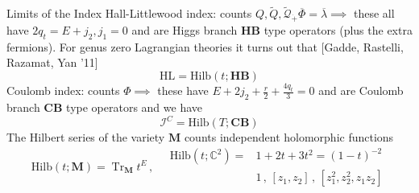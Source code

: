 \documentclass{beamer}
\DeclareMathOperator{\Tr}{Tr}
\begin{document}
\begin{frame}{Limits of the Index}
Hall-Littlewood index: counts $Q,\widetilde{Q}, \widetilde{\mathcal{Q}}_{\dot+}\overline{\Phi}=\overline{\lambda}\implies$ these all have $2q_t=E+j_2,j_1=0$ and are Higgs branch $\mathbf{HB}$ type operators (plus the extra fermions). For genus zero Lagrangian theories it turns out that \color{blue}[Gadde, Rastelli, Razamat, Yan '11]\color{black}
\begin{equation*}
    \mathrm{HL}=\mathrm{Hilb}(t;\mathbf{HB})
\end{equation*}
Coulomb index: counts $\Phi\implies$ these have $E+2j_2+\frac{r}{2}+\frac{4q_t}{3}=0$ and are Coulomb branch $\mathbf{CB}$ type operators and we have
\begin{equation*}
    \mathcal{I}^C=\mathrm{Hilb}(T;\mathbf{CB})
\end{equation*}
The Hilbert series of the variety $\mathbf{M}$ counts independent holomorphic functions
\begin{equation*}
    \mathrm{Hilb}(t;\mathbf{M})=\Tr_{\mathbf{M}}t^E\,,\quad  \begin{aligned}\mathrm{Hilb}(t;\mathbb{C}^2)=&1+2t+3t^2=(1-t)^{-2}\\
    &1\,, \, [z_1,z_2]\,,\, [z_1^2,z_2^2,z_1z_2]\end{aligned}
\end{equation*}

\end{frame}
\end{document}
